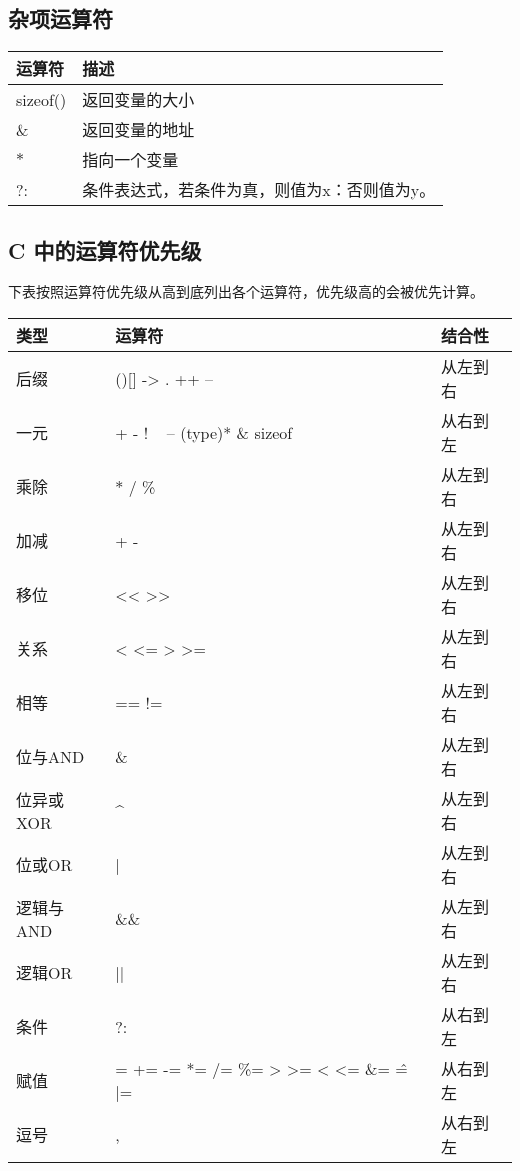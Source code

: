 \documentclass[UTF8]{ctexart}
\begin{document}
	\subsection{杂项运算符}
	\begin{tabular*}{\linewidth}{l|l}
		\toprule
		运算符 & 描述 \\
		\midrule
		sizeof() & 返回变量的大小\\
		\& & 返回变量的地址\\
		$*$ & 指向一个变量\\
		?: & 条件表达式，若条件为真，则值为x：否则值为y。\\
		\bottomrule
	\end{tabular*}
	\subsection{C 中的运算符优先级}
	下表按照运算符优先级从高到底列出各个运算符，优先级高的会被优先计算。
	\begin{tabular*}{\linewidth}{l|l|l}
		\toprule
		类型 & 运算符 & 结合性\\
		\midrule
		后缀 & ()[]	-> . ++ -- & 从左到右\\
		一元 & + - ! ~ -- (type)* \& sizeof & 从右到左\\
		乘除 & $*$ / \% & 从左到右\\
		加减 & + - & 从左到右 \\
		移位 & << >> & 从左到右\\
		关系 & < <= > >= & 从左到右 \\
		相等 & == != & 从左到右 \\
		位与AND & \& & 从左到右 \\
		位异或XOR & \^ & 从左到右 \\
		位或OR & | & 从左到右 \\
		逻辑与AND & \&\& & 从左到右 \\
		逻辑OR & || & 从左到右 \\
		条件 & ?: & 从右到左\\
		赋值 & = += -= *= /= \%= > >= < <= \&= \^= |= & 从右到左\\
		逗号 & , & 从右到左\\
		\bottomrule
	\end{tabular*}
\end{document}
